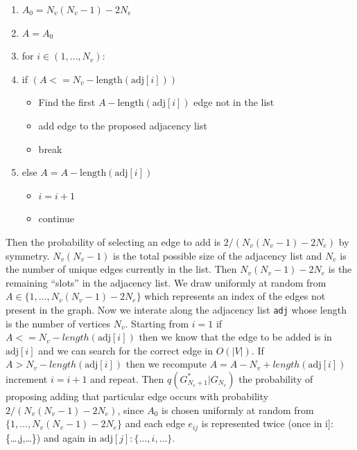 \documentclass[11pt,a4paper]{article}
\providecommand{\tightlist}{%
  \setlength{\itemsep}{0pt}\setlength{\parskip}{0pt}}
\numberwithin{equation}{section}
\begin{document}
\begin{enumerate}
\def\labelenumi{\arabic{enumi}.}
\tightlist
\item
  \(A_0 = N_v(N_v-1) - 2N_e\)
\item
  \(A = A_0\)
\item
  for \(i \in (1,\dots,N_v)\):
\item
  if \((A <= N_v - \text{length}(\text{adj}[i]))\)

  \begin{itemize}
  \tightlist
  \item
    Find the first \(A - \text{length}(\text{adj}[i])\) edge not in the
    list
  \item
    add edge to the proposed adjacency list
  \item
    break
  \end{itemize}
\item
  else \(A = A-\text{length}(\text{adj}[i])\)

  \begin{itemize}
  \tightlist
  \item
    \(i = i + 1\)
  \item
    continue
  \end{itemize}
\end{enumerate}

Then the probability of selecting an edge to add is
\(2/(N_v(N_v-1) - 2N_e)\) by symmetry. \(N_v(N_v-1)\) is the total
possible size of the adjacency list and \(N_e\) is the number of unique
edges currently in the list. Then \(N_v(N_v-1) - 2N_e\) is the remaining
``slots'' in the adjacency list. We draw uniformly at random from
\(A \in \{1,\dots,N_v(N_v-1) - 2N_e\}\) which represents an index of the
edges not present in the graph. Now we interate along the adjacency list
\texttt{adj} whose length is the number of vertices \(N_v\). Starting
from \(i = 1\) if \(A <= N_v - length(\text{adj}[i])\) then we know that
the edge to be added is in \(\text{adj}[i]\) and we can search for the
correct edge in \(O(|V|)\). If \(A > N_v - length(\text{adj}[i])\) then
we recompute \(A = A - N_v + length(\text{adj}[i])\) increment
\(i = i + 1\) and repeat. Then \(q(G^*_{N_e+1}|G_{N_e})\) the
probability of proposing adding that particular edge occurs with
probability \(2/(N_v(N_v-1) - 2N_e)\), since \(A_0\) is chosen uniformly
at random from \(\{1,\dots,N_v(N_v-1) - 2N_e\}\) and each edge
\(e_{ij}\) is represented twice (once in \text{adj}{[}i{]}:
\{\dots,j,\dots\}) and again in \(\text{adj}[j]: \{\dots,i,\dots\}\).
\end{document}
